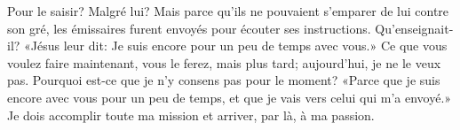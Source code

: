 Pour le saisir? Malgré lui?
Mais parce qu’ils ne pouvaient s’emparer de lui contre son gré,
	les émissaires furent envoyés pour écouter ses instructions.
Qu’enseignait-il?
«Jésus leur dit: Je suis encore pour un peu de temps avec vous.»
Ce que vous voulez faire maintenant, vous le ferez, mais plus tard;
	aujourd’hui, je ne le veux pas.
Pourquoi est-ce que je n’y consens pas pour le moment?
«Parce que je suis encore avec vous pour un peu de temps,
	et que je vais vers celui qui m’a envoyé.»
Je dois accomplir toute ma mission et arriver, par là, à ma passion.
